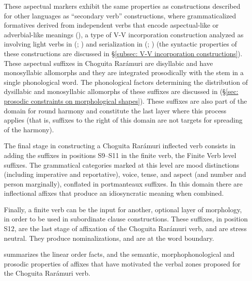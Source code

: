 \hspace*{-2.4pt}These aspectual markers exhibit the same properties as constructions described for other  languages as ``secondary verb'' constructions, where grammaticalized formatives derived from independent verbs that encode aspectual-like or adverbial-like meanings (\citealt{crapo1970origins}), a type of V-V incorporation construction analyzed as involving light verbs in  (; \citealt{tubino2014affixal}) and serialization in  (; \citealt{thornes2011dimensions}) (the syntactic properties of these constructions are discussed in §\ref{subsec: V-V incorporation constructions}). These aspectual suffixes in Choguita Rarámuri are disyllabic and have monosyllabic allomorphs and they are integrated prosodically with the stem in a single phonological word. The phonological factors determining the distribution of dysillabic and monosyllabic allomorphs of these suffixes are discussed in  (§\ref{sec: prosodic constraints on morphological shapes}). These suffixes are also part of the domain for round harmony and constitute the last layer where this process applies (that is, suffixes to the right of this domain are not targets for spreading of the harmony).

The final stage in constructing a Choguita Rarámuri inflected verb consists in adding the suffixes in positions S9--S11 in the finite verb, the Finite Verb level suffixes. The grammatical categories marked at this level are mood distinctions (including imperative and reportative), voice, tense, and aspect (and number and person marginally), conflated in portmanteaux suffixes.  In this domain there are inflectional affixes that produce an idiosyncratic meaning when combined.

Finally, a finite verb can be the input for another, optional layer of morphology, in order to be used in subordinate clause constructions. These suffixes, in position S12, are the last stage of affixation of the Choguita Rarámuri verb, and are stress neutral. They produce nominalizations, and are at the word boundary.

 summarizes the linear order facts, and the semantic, morphophonological and prosodic properties of affixes that have motivated the verbal zones proposed for the Choguita Rarámuri verb.

